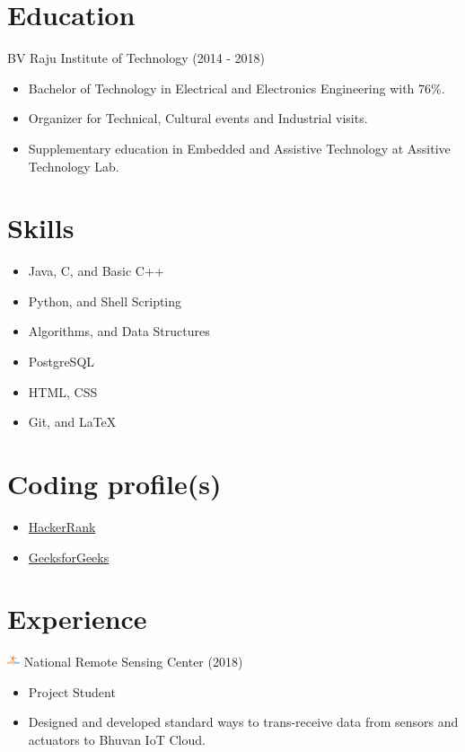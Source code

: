 \documentclass{article}
\begin{document}
\begin{multicols}{2}
\section*{Education}
 BV Raju Institute of Technology (2014 - 2018)
\begin{itemize}
\item \small Bachelor of Technology in Electrical and Electronics Engineering with 76\%.
\item \small Organizer for Technical, Cultural events and Industrial visits.
\item \small Supplementary education in Embedded and Assistive Technology  at Assitive Technology Lab.
\end{itemize}

\section*{Skills}
\begin{itemize}
    \item Java, C, and Basic C++
    \item  Python, and Shell Scripting
    \item Algorithms, and Data Structures
    \item PostgreSQL
    \item HTML, CSS
    \item Git, and \LaTeX
\end{itemize}

\section*{Coding profile(s)}
\begin{itemize}
\item \href {https://hackerrank.com/rcreddyn}{HackerRank}
\item \href {https://auth.geeksforgeeks.org/user/rcreddyn/}{GeeksforGeeks}
\end{itemize}

\section*{Experience}
\includegraphics[width=14px]{isro.png} National Remote Sensing Center (2018)
\begin{itemize}
\item \small Project Student
\item \small Designed and developed standard ways to trans-receive data from sensors and actuators to  Bhuvan IoT Cloud.
\end{itemize}


\end{multicols}
\end{document}
